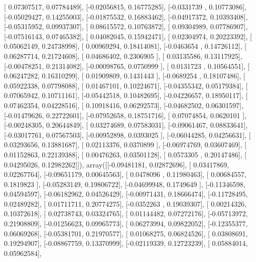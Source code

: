 \documentclass{article}
\begin{document}
       [ 0.07307517,  0.07784489],
       [-0.02056815,  0.16775285],
       [-0.0331739 ,  0.10773086],
       [-0.05029427,  0.14255003],
       [-0.01875532,  0.16883462],
       [-0.04917372,  0.10393408],
       [-0.05315952,  0.09937307],
       [ 0.08615572,  0.10763872],
       [ 0.09304989,  0.07786907],
       [-0.07516143,  0.07465382],
       [ 0.04082045,  0.15942471],
       [ 0.02304974,  0.20223392],
       [ 0.05062149,  0.24738998],
       [ 0.00969294,  0.18414081],
       [-0.0463654 ,  0.14726112],
       [ 0.06287714,  0.21724608],
       [ 0.04686402,  0.2306905 ],
       [ 0.03135586,  0.13117925],
       [-0.00478251,  0.21314082],
       [-0.00098765,  0.0750999 ],
       [ 0.0131723 ,  0.10564551],
       [ 0.06247282,  0.16310299],
       [ 0.01909809,  0.1431443 ],
       [-0.0689254 ,  0.18107486],
       [ 0.05922338,  0.07798088],
       [ 0.01467101,  0.10224671],
       [-0.04355342,  0.05179384],
       [ 0.07065942,  0.10711161],
       [-0.05442518,  0.10482695],
       [-0.04226657,  0.18950117],
       [ 0.07462354,  0.04228516],
       [ 0.10918416,  0.06292573],
       [-0.04682502,  0.06301597],
       [-0.01479626,  0.22722601],
       [-0.07952658,  0.18751716],
       [ 0.07074854,  0.0620101 ],
       [-0.00248305,  0.20644849],
       [ 0.03274689,  0.07583031],
       [-0.09061467,  0.08833641],
       [-0.03017761,  0.07567503],
       [-0.00952898,  0.0393025 ],
       [-0.06044285,  0.04256631],
       [ 0.03293656,  0.13881687],
       [ 0.02113376,  0.0370899 ],
       [-0.06974769,  0.03607469],
       [ 0.01152863,  0.22139388],
       [ 0.00476263,  0.03501128],
       [ 0.0573305 ,  0.20147486],
       [ 0.04295026,  0.12982262]]), array([[-0.09481181,  0.02872696],
       [ 0.03417869,  0.02267764],
       [-0.09651179,  0.00645563],
       [ 0.0478096 ,  0.11980463],
       [ 0.00684557,  0.1819823 ],
       [-0.05283149,  0.19806722],
       [-0.04699948,  0.1749649 ],
       [-0.11346598,  0.04594597],
       [-0.06182962,  0.04526429],
       [-0.00971431,  0.18666474],
       [-0.11728495,  0.02489282],
       [ 0.01711711,  0.20774275],
       [-0.0352263 ,  0.19039307],
       [ 0.00214326,  0.10372618],
       [ 0.02738743,  0.03324765],
       [ 0.01144482,  0.07272176],
       [-0.05713972,  0.21908809],
       [-0.01256623,  0.09965773],
       [ 0.06273994,  0.09822052],
       [-0.12355377,  0.06069268],
       [-0.05381701,  0.21970577],
       [ 0.01068275,  0.06824526],
       [ 0.03808691,  0.19294907],
       [-0.08867759,  0.13370999],
       [-0.02119339,  0.12723239],
       [ 0.05884014,  0.05962584],
\end{document}
